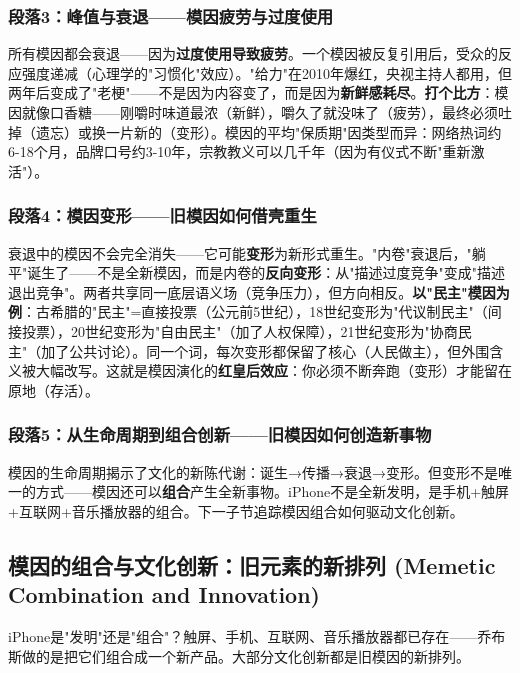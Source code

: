 \documentclass[../main.tex]{subfiles}
\begin{document}
\subsubsection*{段落3：峰值与衰退——模因疲劳与过度使用}

所有模因都会衰退——因为\textbf{过度使用导致疲劳}。一个模因被反复引用后，受众的反应强度递减（心理学的"习惯化"效应）。"给力"在2010年爆红，央视主持人都用，但两年后变成了"老梗"——不是因为内容变了，而是因为\textbf{新鲜感耗尽}。\textbf{打个比方}：模因就像口香糖——刚嚼时味道最浓（新鲜），嚼久了就没味了（疲劳），最终必须吐掉（遗忘）或换一片新的（变形）。模因的平均"保质期"因类型而异：网络热词约6-18个月，品牌口号约3-10年，宗教教义可以几千年（因为有仪式不断"重新激活"）。

\subsubsection*{段落4：模因变形——旧模因如何借壳重生}

衰退中的模因不会完全消失——它可能\textbf{变形}为新形式重生。"内卷"衰退后，"躺平"诞生了——不是全新模因，而是内卷的\textbf{反向变形}：从"描述过度竞争"变成"描述退出竞争"。两者共享同一底层语义场（竞争压力），但方向相反。\textbf{以"民主"模因为例}：古希腊的"民主"=直接投票（公元前5世纪），18世纪变形为"代议制民主"（间接投票），20世纪变形为"自由民主"（加了人权保障），21世纪变形为"协商民主"（加了公共讨论）。同一个词，每次变形都保留了核心（人民做主），但外围含义被大幅改写。这就是模因演化的\textbf{红皇后效应}：你必须不断奔跑（变形）才能留在原地（存活）。

\subsubsection*{段落5：从生命周期到组合创新——旧模因如何创造新事物}

模因的生命周期揭示了文化的新陈代谢：诞生→传播→衰退→变形。但变形不是唯一的方式——模因还可以\textbf{组合}产生全新事物。iPhone不是全新发明，是手机+触屏+互联网+音乐播放器的组合。下一子节追踪模因组合如何驱动文化创新。

\subsection{模因的组合与文化创新：旧元素的新排列 (Memetic Combination and Innovation)}

\begin{motivation}

	iPhone是"发明"还是"组合"？触屏、手机、互联网、音乐播放器都已存在——乔布斯做的是把它们组合成一个新产品。大部分文化创新都是旧模因的新排列。

\end{motivation}
\end{document}
